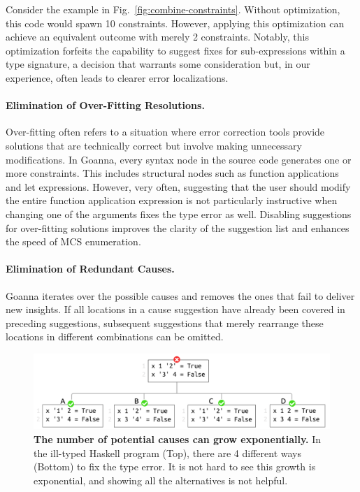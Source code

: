 \documentclass[pdflatex,sn-mathphys-num]{sn-jnl}%
\begin{document}
    Consider the example in Fig.~\ref{fig:combine-constraints}. Without optimization, this code would spawn 10 constraints. However, applying this optimization can achieve an equivalent outcome with merely 2 constraints. Notably, this optimization forfeits the capability to suggest fixes for sub-expressions within a type signature, a decision that warrants some consideration but, in our experience, often leads to clearer error localizations.

    \paragraph{Elimination of Over-Fitting Resolutions.}
    Over-fitting often refers to a situation where error correction tools provide solutions that are technically correct but involve making unnecessary modifications. In Goanna, every syntax node in the source code generates one or more constraints. This includes structural nodes such as function applications and let expressions. However, very often, suggesting that the user should modify the entire function application expression is not particularly instructive when changing one of the arguments fixes the type error as well. Disabling suggestions for over-fitting solutions improves the clarity of the suggestion list and enhances the speed of MCS enumeration.
   

    \paragraph{Elimination of Redundant Causes.}
    Goanna iterates over the possible causes and removes the ones that fail to deliver new insights. If all locations in a cause suggestion have already been covered in preceding suggestions, subsequent suggestions that merely rearrange these locations in different combinations can be omitted.
    
   \begin{figure}[ht!]
        \centering
        \includegraphics[width=0.9\linewidth]{images/Reduction-Example}
        \caption[The number of potential causes can grow exponentially]{\textbf{The number of potential causes can grow exponentially.} In the ill-typed Haskell program (Top), there are 4 different ways (Bottom) to fix the type error. It is not hard to see this growth is exponential, and showing all the alternatives is not helpful.}
        \label{fig:reduction-example}
    \end{figure}
    
\end{document}
